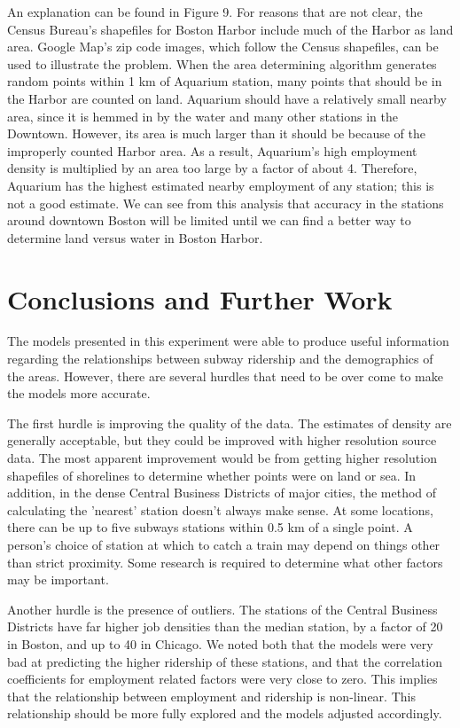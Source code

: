 \documentclass{article}
\begin{document}
An explanation can be found in Figure 9. For reasons that are not clear, the Census Bureau's shapefiles for Boston Harbor include much of the Harbor as land area. Google Map's zip code images, which follow the Census shapefiles, can be used to illustrate the problem. When the area determining algorithm generates random points within 1 km of Aquarium station, many points that should be in the Harbor are counted on land. Aquarium should have a relatively small nearby area, since it is hemmed in by the water and many other stations in the Downtown. However, its area is much larger than it should be because of the improperly counted Harbor area. As a result, Aquarium's high employment density is multiplied by an area too large by a factor of about 4. Therefore, Aquarium has the highest estimated nearby employment of any station; this is not a good estimate. We can see from this analysis that accuracy in the stations around downtown Boston will be limited until we can find a better way to determine land versus water in Boston Harbor.


\section{Conclusions and Further Work}

The models presented in this experiment were able to produce useful information regarding the relationships between subway ridership and the demographics of the areas. However, there are several hurdles that need to be over come to make the models more accurate.

The first hurdle is improving the quality of the data. The estimates of density are generally acceptable, but they could be improved with higher resolution source data. The most apparent improvement would be from getting higher resolution shapefiles of shorelines to determine whether points were on land or sea. In addition, in the dense Central Business Districts of major cities, the method of calculating the 'nearest' station doesn't always make sense. At some locations, there can be up to five subways stations within 0.5 km of a single point. A person's choice of station at which to catch a train may depend on things other than strict proximity. Some research is required to determine what other factors may be important.

Another hurdle is the presence of outliers. The stations of the Central Business Districts have far higher job densities than the median station, by a factor of 20 in Boston, and up to 40 in Chicago. We noted both that the models were very bad at predicting the higher ridership of these stations, and that the correlation coefficients for employment related factors were very close to zero. This implies that the relationship between employment and ridership is non-linear. This relationship should be more fully explored and the models adjusted accordingly.
\end{document}
